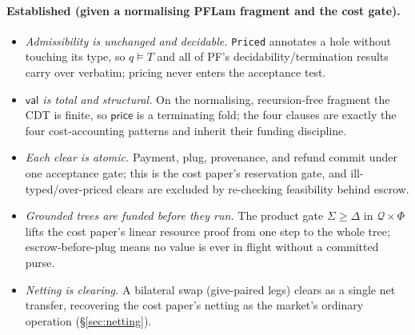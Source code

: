 \documentclass[11pt]{article}
\theoremstyle{definition}
\newcommand{\PF}{\textsf{PF}}
\newcommand{\CDT}{\textsf{CDT}}
\newcommand{\PFLam}{\textsf{PFLam}}
\newcommand{\val}{\ensuremath{\mathsf{val}}}
\newcommand{\price}{\ensuremath{\mathsf{price}}}
\newcommand{\Qval}{\mathcal{Q}}            %
\newcommand{\Phl}{\Phi}                     %
\newcommand{\modelsT}{\models}
\begin{document}
\paragraph{Established (given a normalising \PFLam{} fragment and the cost gate).}
\begin{itemize}[leftmargin=1.4em]
\item \emph{Admissibility is unchanged and decidable.} \texttt{Priced} annotates a hole without
touching its type, so $q\modelsT T$ and all of \PF{}'s decidability/termination results carry over
verbatim; pricing never enters the acceptance test.
\item \emph{$\val$ is total and structural.} On the normalising, recursion-free fragment the \CDT{}
is finite, so $\price$ is a terminating fold; the four clauses are exactly the four cost-accounting
patterns and inherit their funding discipline.
\item \emph{Each clear is atomic.} Payment, plug, provenance, and refund commit under one acceptance
gate; this is the cost paper's reservation gate, and ill-typed/over-priced clears are excluded by
re-checking feasibility behind escrow.
\item \emph{Grounded trees are funded before they run.} The product gate $\Sigma\ge\Delta$ in
$\Qval\times\Phl$ lifts the cost paper's linear resource proof from one step to the whole tree;
escrow-before-plug means no value is ever in flight without a committed purse.
\item \emph{Netting is clearing.} A bilateral swap (\textsf{give}-paired legs) clears as a single
net transfer, recovering the cost paper's netting as the market's ordinary operation
(\S\ref{sec:netting}).
\end{itemize}
\end{document}

